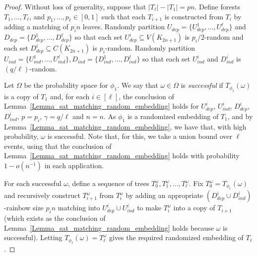 \begin{proof}
Without loss of generality, suppose that  $|T_{\ell}|-|T_1|= pn$.
Define forests $T_1, \dots, T_{\ell}$, and $p_1, \dots, p_{\ell}\in [0,1]$ such that each $T_{i+1}$ is constructed from $T_i$ by adding a matching of $p_in$ leaves.
Randomly partition $U_{dep}=\{U_{dep}^1, \dots, U_{dep}^{\ell}\}$ and $D_{dep}=\{D_{dep}^1, \dots, D_{dep}^{\ell}\}$ so that each set $U_{dep}^i\subseteq V(K_{2n+1})$ is $p_i/2$-random and each set $D_{dep}^i\subseteq C(K_{2n+1})$ is $p_i$-random.
Randomly partition   $U_{ind}=\{U_{ind}^1, \dots, U_{ind}^{\ell}\}, D_{ind}=\{D_{ind}^1, \dots, D_{ind}^{\ell}\}$ so that each set $U_{ind}^i$ and $D_{ind}^i$ is $(q/\ell)$-random.

Let $\Omega$ be the probability space for $\phi_1$.
We say that $\omega\in \Omega$ is \emph{successful} if $T_{\phi_1}(\omega)$ is a copy of $T_1$ and, for each $i\in [\ell]$, the conclusion of Lemma~\ref{Lemma_sat_matching_random_embedding} holds for $U_{dep}^{i}$, $U_{ind}^{i}$, $D_{dep}^{i}$, $D_{ind}^{i}$, $p=p_i$, $\gamma = q/\ell$ and    $n=n$.
As $\phi_1$ is a randomized embedding of $T_1$, and by Lemma~\ref{Lemma_sat_matching_random_embedding}, we have that, with high probability, $\omega$ is successful. Note that, for this, we take a union bound over $\ell$ events, using that the conclusion of Lemma~\ref{Lemma_sat_matching_random_embedding} holds
with probability $1-o(n^{-1})$ in each application.

For each successful $\omega$, define a sequence of trees $T_0^{\omega},T_1^{\omega}, \dots, T_{\ell}^{\omega}$. Fix $T_0^{\omega}=T_{\phi_1}(\omega)$ and recursively construct $T_{i+1}^{\omega}$ from $T_i^{\omega}$ by adding an appropriate $(D_{dep}^i\cup D_{ind}^i)$-rainbow size $p_in$ matching into $U_{dep}^i\cup U_{ind}^i$ to make $T_i^\omega$ into a copy of $T_{i+1}$ (which exists as the conclusion of Lemma~\ref{Lemma_sat_matching_random_embedding} holds because $\omega$ is successful).
Letting $T_{\phi_{\ell}}(\omega)= T_{\ell}^{\omega}$ gives the required randomized embedding of $T_{\ell}$.
\end{proof}


